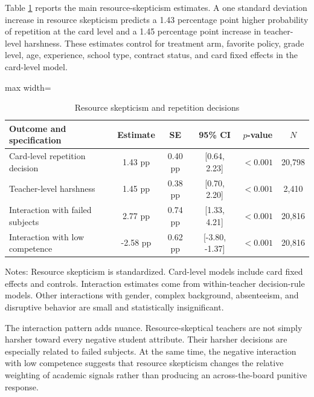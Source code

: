 \documentclass[12pt,a4paper]{article}
\newcommand{\ci}[2]{[#1, #2]}
\begin{document}
Table \ref{tab:resource} reports the main resource-skepticism estimates. A one standard deviation increase in resource skepticism predicts a 1.43 percentage point higher probability of repetition at the card level and a 1.45 percentage point increase in teacher-level harshness. These estimates control for treatment arm, favorite policy, grade level, age, experience, school type, contract status, and card fixed effects in the card-level model.

\begin{table}[!htbp]
\centering
\caption{Resource skepticism and repetition decisions}
\label{tab:resource}
\begin{threeparttable}
\begin{adjustbox}{max width=\textwidth}
\begin{tabular}{lccccc}
\toprule
Outcome and specification & Estimate & SE & 95\% CI & \(p\)-value & \(N\) \\
\midrule
Card-level repetition decision & 1.43 pp & 0.40 pp & \ci{0.64}{2.23} & \(<0.001\) & 20,798 \\
Teacher-level harshness & 1.45 pp & 0.38 pp & \ci{0.70}{2.20} & \(<0.001\) & 2,410 \\
\midrule
Interaction with failed subjects & 2.77 pp & 0.74 pp & \ci{1.33}{4.21} & \(<0.001\) & 20,816 \\
Interaction with low competence & -2.58 pp & 0.62 pp & \ci{-3.80}{-1.37} & \(<0.001\) & 20,816 \\
\bottomrule
\end{tabular}
\end{adjustbox}
\begin{tablenotes}[flushleft]
\footnotesize
\item Notes: Resource skepticism is standardized. Card-level models include card fixed effects and controls. Interaction estimates come from within-teacher decision-rule models. Other interactions with gender, complex background, absenteeism, and disruptive behavior are small and statistically insignificant.
\end{tablenotes}
\end{threeparttable}
\end{table}

The interaction pattern adds nuance. Resource-skeptical teachers are not simply harsher toward every negative student attribute. Their harsher decisions are especially related to failed subjects. At the same time, the negative interaction with low competence suggests that resource skepticism changes the relative weighting of academic signals rather than producing an across-the-board punitive response.
\end{document}
